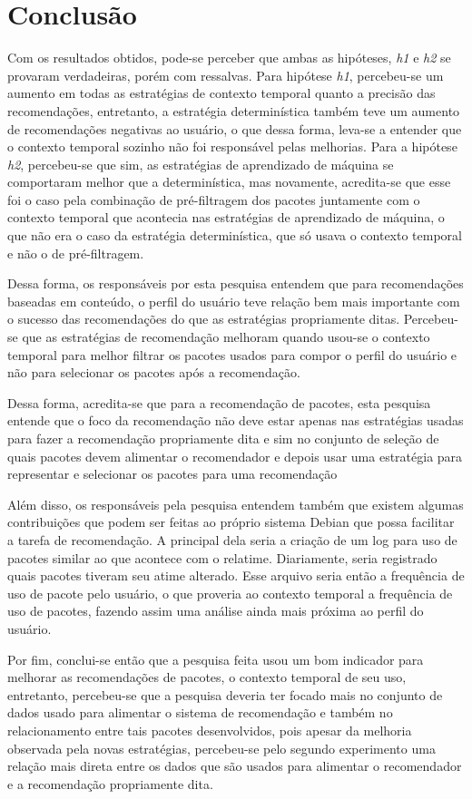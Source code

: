 \chapter[Conclusão]{Conclusão}

Com os resultados obtidos, pode-se perceber que ambas as hipóteses, \textit{h1}
e \textit{h2} se provaram verdadeiras, porém com ressalvas. Para hipótese
\textit{h1}, percebeu-se um aumento em todas as estratégias de contexto
temporal quanto a precisão das recomendações, entretanto, a estratégia
determinística também teve um aumento de recomendações negativas ao usuário, o
que dessa forma, leva-se a entender que o contexto temporal sozinho não foi
responsável pelas melhorias. Para a hipótese \textit{h2}, percebeu-se que sim,
as estratégias de aprendizado de máquina se comportaram melhor que a
determinística, mas novamente, acredita-se que esse foi o caso pela combinação
de pré-filtragem dos pacotes juntamente com o contexto temporal que acontecia
nas estratégias de aprendizado de máquina, o que não era o caso da estratégia
determinística, que só usava o contexto temporal e não o de pré-filtragem.

Dessa forma, os responsáveis por esta pesquisa entendem que para recomendações
baseadas em conteúdo, o perfil do usuário teve relação bem mais importante com o
sucesso das recomendações do que as estratégias propriamente ditas. Percebeu-se
que as estratégias de recomendação melhoram quando usou-se o contexto temporal
para melhor filtrar os pacotes usados para compor o perfil do usuário e não para
selecionar os pacotes após a recomendação.

Dessa forma, acredita-se que para a recomendação de pacotes, esta pesquisa
entende que o foco da recomendação não deve estar apenas nas estratégias usadas
para fazer a recomendação propriamente dita e sim no conjunto de seleção de
quais pacotes devem alimentar o recomendador e depois usar uma estratégia
para representar e selecionar os pacotes para uma recomendação

Além disso, os responsáveis pela pesquisa entendem também que existem algumas
contribuições que podem ser feitas ao próprio sistema Debian que possa facilitar
a tarefa de recomendação. A principal dela seria a criação de um log para uso de
pacotes similar ao que acontece com o relatime. Diariamente, seria registrado
quais pacotes tiveram seu atime alterado. Esse arquivo seria então a frequência
de uso de pacote pelo usuário, o que proveria ao contexto temporal a frequência
de uso de pacotes, fazendo assim uma análise ainda mais próxima ao perfil do
usuário.

Por fim, conclui-se então que a pesquisa feita usou um bom indicador para melhorar as
recomendações de pacotes, o contexto temporal de seu uso, entretanto,
percebeu-se que a pesquisa deveria ter focado mais no conjunto de dados usado
para alimentar o sistema de recomendação e também no relacionamento entre tais
pacotes desenvolvidos, pois apesar da melhoria observada pela novas estratégias,
percebeu-se pelo segundo experimento uma relação mais direta entre os dados que
são usados para alimentar o recomendador e a recomendação propriamente dita.
